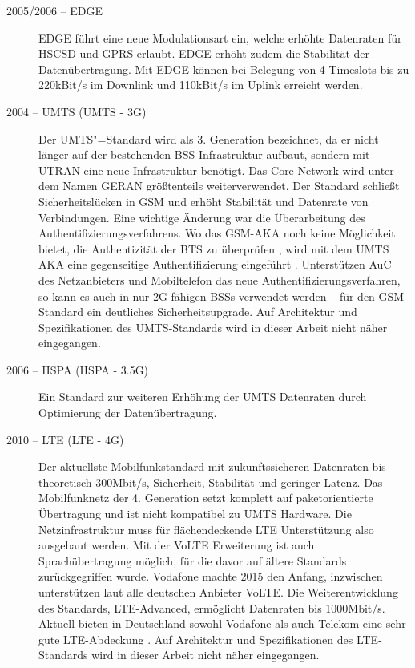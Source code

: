 \begin{description}
\item[2005/2006 -- \ac{EDGE}]
 \ac{EDGE} führt eine neue Modulationsart ein, welche erhöhte Datenraten für \ac{HSCSD} und \ac{GPRS} erlaubt.  \ac{EDGE} erhöht zudem die Stabilität der Datenübertragung. Mit \ac{EDGE} können bei Belegung von 4 Timeslots bis zu 220kBit/s im Downlink und 110kBit/s im Uplink erreicht werden.
\item[2004 --  \acl{UMTS} (\acs{UMTS} - 3G)]
Der  \ac{UMTS}"=Standard wird als 3. Generation bezeichnet, da er nicht länger auf der bestehenden \ac{BSS} Infrastruktur aufbaut, sondern mit \ac{UTRAN} eine neue Infrastruktur benötigt. Das Core Network wird unter dem Namen \ac{GERAN} größtenteils weiterverwendet. Der Standard schließt Sicherheitslücken in \ac{GSM} und erhöht Stabilität und Datenrate von Verbindungen. Eine wichtige Änderung war die Überarbeitung des Authentifizierungsverfahrens. Wo das \ac{GSM}-\ac{AKA} noch keine Möglichkeit bietet, die Authentizität der \ac{BTS} zu überprüfen , wird mit dem \ac{UMTS} \ac{AKA} eine gegenseitige Authentifizierung eingeführt . Unterstützen \ac{AuC} des Netzanbieters und Mobiltelefon das neue Authentifizierungsverfahren, so kann es auch in nur 2G-fähigen \acp{BSS} verwendet werden -- für den \ac{GSM}-Standard ein deutliches Sicherheitsupgrade.
Auf Architektur und Spezifikationen des  \ac{UMTS}-Standards wird in dieser Arbeit nicht näher eingegangen.
\item[2006 -- \acl{HSPA} (\acs{HSPA} - 3.5G)]
Ein Standard zur weiteren Erhöhung der  \ac{UMTS} Datenraten durch Optimierung der Datenübertragung.
\item[2010 -- \acl{LTE} (\acs{LTE} - 4G)]
Der aktuellste Mobilfunkstandard mit zukunftssicheren Datenraten bis theoretisch 300Mbit/s, Sicherheit, Stabilität und geringer Latenz. Das Mobilfunknetz der 4. Generation setzt komplett auf paketorientierte Übertragung und ist nicht kompatibel zu  \ac{UMTS} Hardware. Die Netzinfrastruktur muss für flächendeckende \ac{LTE} Unterstützung also ausgebaut werden. Mit der \ac{VoLTE} Erweiterung ist auch Sprachübertragung möglich, für die davor auf ältere Standards zurückgegriffen wurde. Vodafone machte 2015 den Anfang, inzwischen unterstützen laut  alle deutschen Anbieter \ac{VoLTE}. Die Weiterentwicklung des Standards, \ac{LTE}-Advanced, ermöglicht Datenraten bis 1000Mbit/s. Aktuell bieten in Deutschland sowohl Vodafone als auch Telekom eine sehr gute \ac{LTE}-Abdeckung \citep{ltemap:ltemap}\citep{opensignal}. Auf Architektur und Spezifikationen des \ac{LTE}-Standards wird in dieser Arbeit nicht näher eingegangen.

\end{description}
